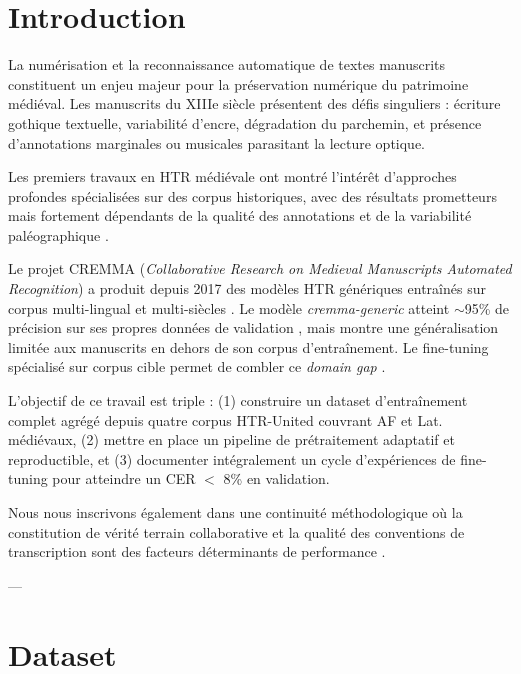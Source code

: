 ﻿\documentclass[twoside,twocolumn,10pt]{article}
\begin{document}

\section{Introduction}
\fontsize{11}{13}\selectfont
\justifying
La numérisation et la reconnaissance automatique de textes manuscrits constituent un enjeu majeur pour la préservation numérique du patrimoine médiéval. Les manuscrits du XIIIe siècle présentent des défis singuliers : écriture gothique textuelle, variabilité d'encre, dégradation du parchemin, et présence d'annotations marginales ou musicales parasitant la lecture optique.

Les premiers travaux en HTR médiévale ont montré l'intérêt d'approches profondes spécialisées sur des corpus historiques, avec des résultats prometteurs mais fortement dépendants de la qualité des annotations et de la variabilité paléographique \cite{dell2015deep,covid2018high,medieval_scripts2017}.

Le projet CREMMA (\textit{Collaborative Research on Medieval Manuscripts Automated Recognition}) a produit depuis 2017 des modèles HTR génériques entraînés sur corpus multi-lingual et multi-siècles \cite{cremma2022}. Le modèle \textit{cremma-generic} atteint $\sim$95\% de précision sur ses propres données de validation \cite{zenodo7234166}, mais montre une généralisation limitée aux manuscrits en dehors de son corpus d'entraînement. Le fine-tuning spécialisé sur corpus cible permet de combler ce \textit{domain gap} \cite{transfer_learning2019}.

L'objectif de ce travail est triple : (1) construire un dataset d'entraînement complet agrégé depuis quatre corpus HTR-United couvrant AF et Lat. médiévaux, (2) mettre en place un pipeline de prétraitement adaptatif et reproductible, et (3) documenter intégralement un cycle d'expériences de fine-tuning pour atteindre un CER $<$ 8\% en validation.

Nous nous inscrivons également dans une continuité méthodologique où la constitution de vérité terrain collaborative et la qualité des conventions de transcription sont des facteurs déterminants de performance \cite{crowdsourcing_htr2020}.

---

\section{Dataset}
\fontsize{11}{13}\selectfont
\justifying
\end{document}
